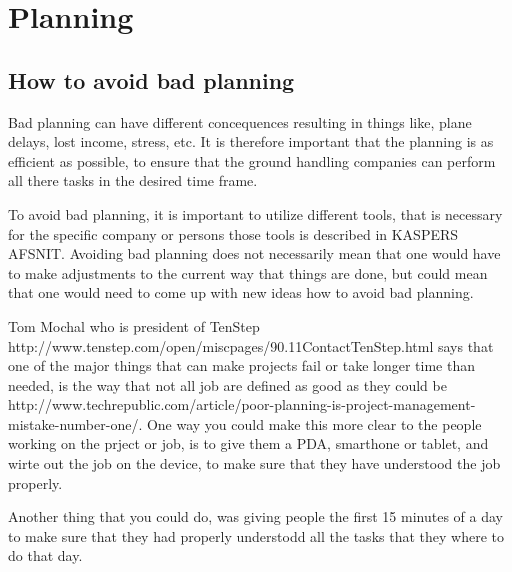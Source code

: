 \chapter{Planning}
\section{How to avoid bad planning}

Bad planning can have different concequences resulting in things like, plane delays, lost income, stress, etc. It is therefore important that the planning is as efficient as possible, to ensure that the ground handling companies can perform all there tasks in the desired time frame.

To avoid bad planning, it is important to utilize different tools, that is necessary for the specific company or persons those tools is described in KASPERS AFSNIT. Avoiding bad planning does not necessarily mean that one would have to make adjustments to the current way that things are done, but could mean that one would need to come up with new ideas how to avoid bad planning.

Tom Mochal who is president of TenStep http://www.tenstep.com/open/miscpages/90.11ContactTenStep.html says that one of the major things that can make projects fail or take longer time than needed, is the way that not all job are defined as good as they could be http://www.techrepublic.com/article/poor-planning-is-project-management-mistake-number-one/. One way you could make this more clear to the people working on the prject or job, is to give them a PDA, smarthone or tablet, and wirte out the job on the device, to make sure that they have understood the job properly.

Another thing that you could do, was giving people the first 15 minutes of a day to make sure that they had properly understodd all the tasks that they where to do that day.
